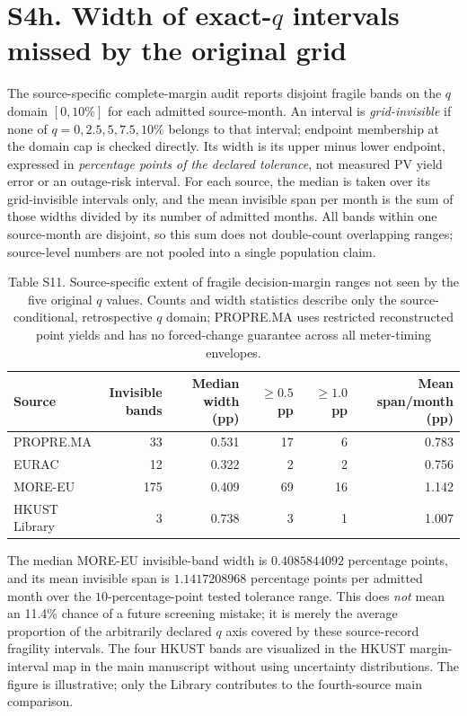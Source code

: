 \documentclass[11pt]{article}
\begin{document}
\section*{S4h. Width of exact-$q$ intervals missed by the original grid}
The source-specific complete-margin audit reports disjoint fragile bands on the $q$ domain $[0,10\%]$ for each admitted source-month. An interval is \emph{grid-invisible} if none of $q=0,2.5,5,7.5,10\%$ belongs to that interval; endpoint membership at the domain cap is checked directly. Its width is its upper minus lower endpoint, expressed in \emph{percentage points of the declared tolerance}, not measured PV yield error or an outage-risk interval. For each source, the median is taken over its grid-invisible intervals only, and the mean invisible span per month is the sum of those widths divided by its number of admitted months. All bands within one source-month are disjoint, so this sum does not double-count overlapping ranges; source-level numbers are not pooled into a single population claim.

\begin{table}[ht]
\centering
\caption*{Table S11. Source-specific extent of fragile decision-margin ranges not seen by the five original $q$ values. Counts and width statistics describe only the source-conditional, retrospective $q$ domain; PROPRE.MA uses restricted reconstructed point yields and has no forced-change guarantee across all meter-timing envelopes.}
\scriptsize
\setlength{\tabcolsep}{3pt}
\begin{tabular}{p{2.7cm}rrrrr}
\toprule
Source & \shortstack{Invisible\\bands} & \shortstack{Median width\\(pp)} & \shortstack{$\geq0.5$\\pp} & \shortstack{$\geq1.0$\\pp} & \shortstack{Mean span/month\\(pp)} \\
\midrule
PROPRE.MA & 33 & 0.531 & 17 & 6 & 0.783 \\
EURAC & 12 & 0.322 & 2 & 2 & 0.756 \\
MORE-EU & 175 & 0.409 & 69 & 16 & 1.142 \\
HKUST Library & 3 & 0.738 & 3 & 1 & 1.007 \\
\bottomrule
\end{tabular}
\end{table}

The median MORE-EU invisible-band width is $0.4085844092$ percentage points, and its mean invisible span is $1.1417208968$ percentage points per admitted month over the $10$-percentage-point tested tolerance range. This does \emph{not} mean an 11.4\% chance of a future screening mistake; it is merely the average proportion of the arbitrarily declared $q$ axis covered by these source-record fragility intervals. The four HKUST bands are visualized in the HKUST margin-interval map in the main manuscript without using uncertainty distributions. The figure is illustrative; only the Library contributes to the fourth-source main comparison.
\end{document}
